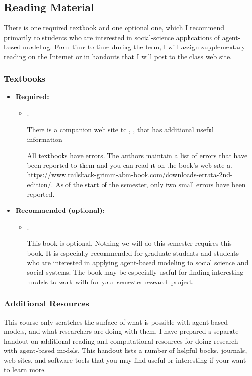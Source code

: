 \documentclass[11pt,twoside]{jgsyllabus}\usepackage[]{graphicx}\usepackage[]{xcolor}
\begin{document}
\subsection{Reading Material}
There is one required textbook and one optional one, which I recommend primarily
to students who are interested in social-science applications of agent-based
modeling.
From time to time during the term, I will assign supplementary reading on the
Internet or in handouts that I will post to the class web site.

\subsubsection{Textbooks}
\begin{itemize}
  \item \textbf{Required:}
    \begin{itemize}
	    \item \LongRailsback.

      There is a companion web site to \emph{\Railsback}, \RailsbackURL, that
      has additional useful information.

      All textbooks have errors. The authors maintain a list of errors that have
      been reported to them and you can read it on the book's web site at
      \url{https://www.railsback-grimm-abm-book.com/downloads-errata-2nd-edition/}.
      As of the start of the semester, only two small errors have been reported.
    \end{itemize}

  \item \textbf{Recommended (optional):}
    \begin{itemize}
	    \item \LongSmaldino.

	    This book is optional. Nothing we will do this semester requires this book.
	    It is especially recommended for graduate students and students who are
	    interested in applying agent-based modeling to social science and social
	    systems. The book may be especially useful for finding interesting models
	    to work with for your semester research project.
    \end{itemize}
\end{itemize}

\subsubsection{Additional Resources}
This course only scratches the surface of what is possible with agent-based
models, and what researchers are doing with them.
I have prepared a separate handout on additional reading and computational
resources for doing research with agent-based models.
This handout lists a number of helpful books, journals, web sites, and software
tools that you may find useful or interesting if your want to learn more.
\end{document}
